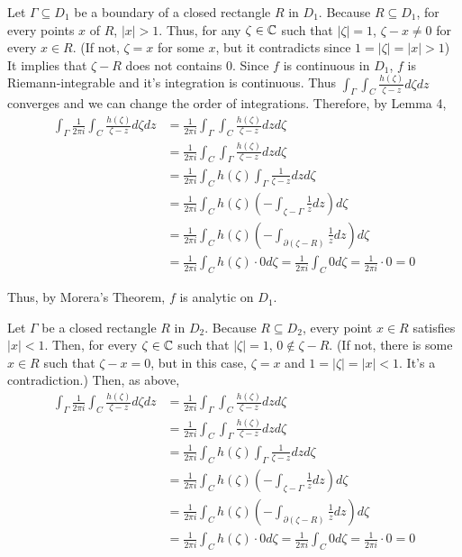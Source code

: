   Let \(\Gamma \subseteq D_1\) be a boundary of a closed rectangle \(R\) in \(D_1\).
  Because \(R \subseteq D_1\), for every points \(x\) of \(R\), \(|x| > 1\).
  Thus, for any \(\zeta \in \mathbb{C}\) such that \(|\zeta| = 1\),
  \(\zeta - x \neq 0\) for every \(x \in R\).
  (If not, \(\zeta = x\) for some \(x\), but it contradicts since \(1 = |\zeta| = |x| > 1\))
  It implies that \(\zeta - R\) does not contains \(0\).
  Since \(f\) is continuous in \(D_1\), \(f\) is Riemann-integrable and it's integration is continuous.
  Thus \(\int_\Gamma \int_C \frac{h(\zeta)}{\zeta - z} d\zeta dz\) converges and we can change the order of integrations.
  Therefore, by Lemma 4,
\begin{align*}
  \int_{\Gamma} \frac{1}{2\pi i} \int_{C} \frac{h(\zeta)}{\zeta - z} d\zeta dz
  &= \frac{1}{2\pi i} \int_{\Gamma} \int_{C} \frac{h(\zeta)}{\zeta - z} dz d\zeta
  \\&= \frac{1}{2\pi i} \int_{C} \int_{\Gamma} \frac{h(\zeta)}{\zeta - z} dz d\zeta
  \\&= \frac{1}{2\pi i} \int_{C} h(\zeta) \int_{\Gamma} \frac{1}{\zeta - z} dz d\zeta
  \\&= \frac{1}{2\pi i} \int_{C} h(\zeta)
    \left(- \int_{\zeta - \Gamma} \frac{1}{z} dz \right) d\zeta
  \\&= \frac{1}{2\pi i} \int_{C} h(\zeta)
    \left(- \int_{\partial(\zeta - R)} \frac{1}{z} dz \right) d\zeta
  \\&= \frac{1}{2\pi i} \int_{C} h(\zeta) \cdot 0 d\zeta
  = \frac{1}{2\pi i} \int_{C} 0 d\zeta
  = \frac{1}{2\pi i} \cdot 0
  = 0
\end{align*}

Thus, by Morera's Theorem, \(f\) is analytic on \(D_1\).

Let \(\Gamma\) be a closed rectangle \(R\) in \(D_2\).
Because \(R \subseteq D_2\), every point \(x \in R\) satisfies \(|x| < 1\).
Then, for every \(\zeta \in \mathbb{C}\) such that \(|\zeta| = 1\), \(0 \not\in \zeta - R\).
(If not, there is some \(x \in R\) such that \(\zeta - x = 0\), but in this case, \(\zeta = x\) and \(1 = |\zeta| = |x| < 1\). It's a contradiction.)
Then, as above,
\begin{align*}
  \int_{\Gamma} \frac{1}{2\pi i} \int_{C} \frac{h(\zeta)}{\zeta - z} d\zeta dz
  &= \frac{1}{2\pi i} \int_{\Gamma} \int_{C} \frac{h(\zeta)}{\zeta - z} dz d\zeta
  \\&= \frac{1}{2\pi i} \int_{C} \int_{\Gamma} \frac{h(\zeta)}{\zeta - z} dz d\zeta
  \\&= \frac{1}{2\pi i} \int_{C} h(\zeta) \int_{\Gamma} \frac{1}{\zeta - z} dz d\zeta
  \\&= \frac{1}{2\pi i} \int_{C} h(\zeta)
    \left(- \int_{\zeta - \Gamma} \frac{1}{z} dz \right) d\zeta
  \\&= \frac{1}{2\pi i} \int_{C} h(\zeta)
    \left(- \int_{\partial(\zeta - R)} \frac{1}{z} dz \right) d\zeta
  \\&= \frac{1}{2\pi i} \int_{C} h(\zeta) \cdot 0 d\zeta
  = \frac{1}{2\pi i} \int_{C} 0 d\zeta
  = \frac{1}{2\pi i} \cdot 0
  = 0
\end{align*}

